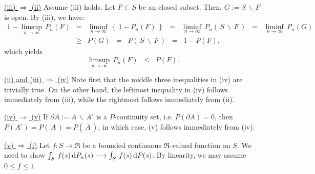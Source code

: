 \vskip 0.3cm
\noindent
\underline{(iii) $\Longrightarrow$ (ii)}
\vskip 0.2cm
\noindent
Assume (iii) holds. Let $F \subset S$ be an closed subset.
Then, $G := S\,\backslash\,F$ is open. By (iii), we have:
\begin{eqnarray*}
1 - \limsup_{n\rightarrow\infty}\,P_{n}\!\left(F\right)
&=& \liminf_{n\rightarrow\infty}\,\left\{\,1 - P_{n}\!\left(F\right)\,\right\}
\;\;=\;\;\liminf_{n\rightarrow\infty}\,P_{n}\!\left(\,S\,\backslash\,F\,\right)
\;\;=\;\;\liminf_{n\rightarrow\infty}\,P_{n}(G)
\\
&\geq& P\!\left(G\right)
\;\;=\;\; P\!\left(\,S\,\backslash\,F\,\right)
\;\;=\;\; 1 - P\!\left(F\right),
\end{eqnarray*}
which yields
\begin{equation}
\limsup_{n\rightarrow\infty}\,P_{n}\!\left(F\right)
\;\;\leq\;\; P\!\left(F\right).
\end{equation}

\vskip 0.3cm
\noindent
\underline{(ii) and (iii) $\Longrightarrow$ (iv)}
\vskip 0.2cm
\noindent
Note first that the middle three inequalities in (iv) are trivially true.
On the other hand, the leftmost inequality in (iv) follows immediately from (iii),
while the rightmost follows immediately from (ii).

\mbox{}
\vskip 0.3cm
\noindent
\underline{(iv) $\Longrightarrow$ (v)}
\vskip 0.2cm
\noindent
If $\partial A := \overline{A}\,\backslash\,A^{\circ}$ is a $P$-continuity set,
i.e. $P\!\left(\partial A\right) = 0$, then
$P\!\left(A^{\circ}\right) = P\!\left(\,A\,\right) = P\!\left(\,\overline{A}\,\right)$,
in which case, (v) follows immediately from (iv).

\vskip 0.8cm
\noindent
\underline{(v) $\Longrightarrow$ (i)}
\vskip 0.2cm
\noindent
Let $f : S \longrightarrow \Re$ be a bounded continuous $\Re$-valued function on $S$.
We need to show $\int_{S}\,f(s)\,\textnormal{d} P_{n}(s) \longrightarrow \int_{S}\,f(s)\,\textnormal{d} P(s)$.
By linearity, we may assume $0 \leq f \leq 1$.

